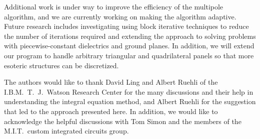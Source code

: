 Additional work is under way to improve the efficiency of the
multipole algorithm, and we are currently working on making the
algorithm adaptive.  Future research includes investigating using
block iterative techniques to reduce the number of iterations required
and extending the approach to solving problems with piecewise-constant
dielectrics and ground planes.  In addition, we will extend our
program to handle arbitrary triangular and 
quadrilateral panels so that more esoteric
structures can be discretized.

The authors would like to thank David Ling and Albert Ruehli of the
I.B.M.\ T.\ J.\ Watson Research Center for the many discussions and
their help in understanding the integral equation method, and Albert
Ruehli for the suggestion that led to the approach presented here.  In
addition, we would like to acknowledge the helpful discussions with
Tom Simon and the members of the M.I.T.\ custom integrated circuits
group.
